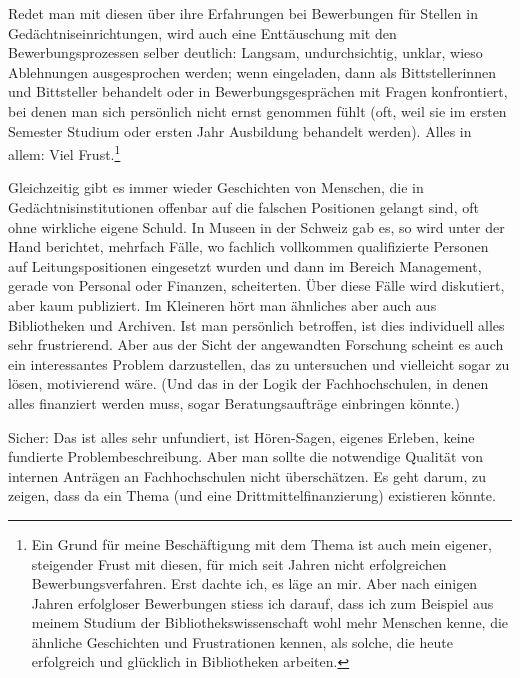 \documentclass[a4paper,
fontsize=11pt,
oneside,
numbers=noperiodatend,
parskip=half-,
bibliography=totoc,
final
]{scrartcl}
\begin{document}
Redet man mit diesen über ihre Erfahrungen bei Bewerbungen für Stellen
in Gedächtniseinrichtungen, wird auch eine Enttäuschung mit den
Bewerbungsprozessen selber deutlich: Langsam, undurchsichtig, unklar,
wieso Ablehnungen ausgesprochen werden; wenn eingeladen, dann als
Bittstellerinnen und Bittsteller behandelt oder in Bewerbungsgesprächen
mit Fragen konfrontiert, bei denen man sich persönlich nicht ernst
genommen fühlt (oft, weil sie im ersten Semester Studium oder ersten
Jahr Ausbildung behandelt werden). Alles in allem: Viel Frust.\footnote{Ein
  Grund für meine Beschäftigung mit dem Thema ist auch mein eigener,
  steigender Frust mit diesen, für mich seit Jahren nicht erfolgreichen
  Bewerbungsverfahren. Erst dachte ich, es läge an mir. Aber nach
  einigen Jahren erfolgloser Bewerbungen stiess ich darauf, dass ich zum
  Beispiel aus meinem Studium der Bibliothekswissenschaft wohl mehr
  Menschen kenne, die ähnliche Geschichten und Frustrationen kennen, als
  solche, die heute erfolgreich und glücklich in Bibliotheken arbeiten.}

Gleichzeitig gibt es immer wieder Geschichten von Menschen, die in
Gedächtnisinstitutionen offenbar auf die falschen Positionen gelangt
sind, oft ohne wirkliche eigene Schuld. In Museen in der Schweiz gab es,
so wird unter der Hand berichtet, mehrfach Fälle, wo fachlich vollkommen
qualifizierte Personen auf Leitungspositionen eingesetzt wurden und dann
im Bereich Management, gerade von Personal oder Finanzen, scheiterten.
Über diese Fälle wird diskutiert, aber kaum publiziert. Im Kleineren
hört man ähnliches aber auch aus Bibliotheken und Archiven. Ist man
persönlich betroffen, ist dies individuell alles sehr frustrierend. Aber
aus der Sicht der angewandten Forschung scheint es auch ein
interessantes Problem darzustellen, das zu untersuchen und vielleicht
sogar zu lösen, motivierend wäre. (Und das in der Logik der
Fachhochschulen, in denen alles finanziert werden muss, sogar
Beratungsaufträge einbringen könnte.)

Sicher: Das ist alles sehr unfundiert, ist Hören-Sagen, eigenes Erleben,
keine fundierte Problembeschreibung. Aber man sollte die notwendige
Qualität von internen Anträgen an Fachhochschulen nicht überschätzen. Es
geht darum, zu zeigen, dass da ein Thema (und eine
Drittmittelfinanzierung) existieren könnte.
\end{document}
